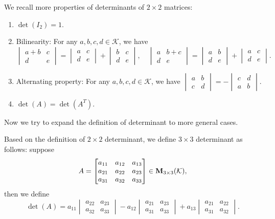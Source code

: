     We recall more properties of determinants of $2\times 2$ matrices:
    \begin{enumerate}
        \item $\det(I_2) = 1$.
        \item Bilinearity: For any $a,b,c,d \in \mathcal{K}$, we have
        \[
        \begin{vmatrix} a+b & c \\ d & e \end{vmatrix} = \begin{vmatrix} a & c \\ d & e \end{vmatrix} + \begin{vmatrix} b & c \\ d & e \end{vmatrix}, \quad \begin{vmatrix} a & b+c \\ d & e \end{vmatrix} = \begin{vmatrix} a & b \\ d & e \end{vmatrix} + \begin{vmatrix} a & c \\ d & e \end{vmatrix}.
        \]
        \item Alternating property: For any $a,b,c,d \in \mathcal{K}$, we have
        \(
        \begin{vmatrix} a & b \\ c & d \end{vmatrix} = -\begin{vmatrix} c & d \\ a & b \end{vmatrix}.
        \)
        \item $\det(A)=\det(A^T)$.
    \end{enumerate}
    Now we try to expand the definition of determinant to more general cases.
    \begin{definitionenv}
        Based on the definition of $2\times 2$ determinant, we define $3\times 3$ determinant as follows: suppose
        \[
        A = \begin{bmatrix}
        a_{11} & a_{12} & a_{13} \\
        a_{21} & a_{22} & a_{23} \\
        a_{31} & a_{32} & a_{33}
        \end{bmatrix} \in \mathbf{M}_{3 \times 3}(\mathcal{K}),
        \]
        then we define
        \[
        \det(A) = a_{11} \begin{vmatrix} a_{22} & a_{23} \\ a_{32} & a_{33} \end{vmatrix} - a_{12} \begin{vmatrix} a_{21} & a_{23} \\ a_{31} & a_{33} \end{vmatrix} + a_{13} \begin{vmatrix} a_{21} & a_{22} \\ a_{31} & a_{32} \end{vmatrix}.
        \]
    \end{definitionenv}
